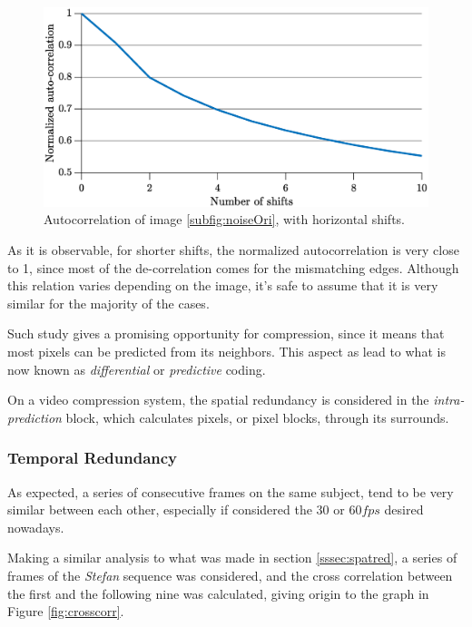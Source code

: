 \begin{figure}[h]
    \centering
    \includegraphics[width=\textwidth]{Sections/2AV1/Diagrams/intracorr.eps}
    \caption{Autocorrelation of image \ref{subfig:noiseOri}, with horizontal shifts.}
    \label{fig:autocorr}
\end{figure}

As it is observable, for shorter shifts, the normalized autocorrelation is very close to 1, since most of the de-correlation comes for the mismatching edges. Although this relation varies depending on the image, it's safe to assume that it is very similar for the majority of the cases.

Such study gives a promising opportunity for compression, since it means that most pixels can be predicted from its neighbors. This aspect as lead to what is now known as \emph{differential} or \emph{predictive} coding.

On a video compression system, the spatial redundancy is considered in the \emph{intra-prediction} block, which calculates pixels, or pixel blocks, through its surrounds.

\subsubsection{Temporal Redundancy}

As expected, a series of consecutive frames on the same subject, tend to be very similar between each other, especially if considered the $30$ or $60 fps$ desired nowadays. 

Making a similar analysis to what was made in section \ref{sssec:spatred}, a series of frames of the \emph{Stefan} sequence \cite{YUVSequences} was considered, and the cross correlation between the first and the following nine was calculated, giving origin to the graph in Figure \ref{fig:crosscorr}.

